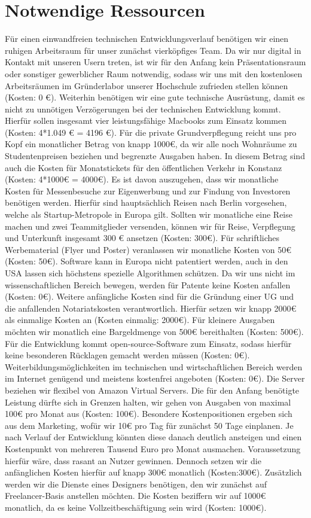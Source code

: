 \section{Notwendige Ressourcen}
Für einen einwandfreien technischen Entwicklungsverlauf benötigen wir einen ruhigen Arbeitsraum für unser zunächst vierköpfiges Team. Da wir nur digital in Kontakt mit unseren Usern treten, ist wir für den Anfang kein Präsentationsraum oder sonstiger gewerblicher Raum notwendig, sodass wir uns mit den kostenlosen Arbeitsräumen im Gründerlabor unserer Hochschule zufrieden stellen können (Kosten: 0 €). 
Weiterhin benötigen wir eine gute technische Ausrüstung, damit es nicht zu unnötigen Verzögerungen bei der technischen Entwicklung kommt. Hierfür sollen insgesamt vier leistungsfähige Macbooks zum Einsatz kommen (Kosten: 4*1.049 € = 4196 €).
Für die private Grundverpflegung reicht uns pro Kopf ein monatlicher Betrag von knapp 1000€, da wir alle noch Wohnräume zu Studentenpreisen beziehen und begrenzte Ausgaben haben. In diesem Betrag sind auch die Kosten für Monatstickets für den öffentlichen Verkehr in Konstanz (Kosten: 4*1000€ = 4000€).
Es ist davon auszugehen, dass wir monatliche Kosten für Messenbesuche zur Eigenwerbung und zur Findung von Investoren benötigen werden. Hierfür sind hauptsächlich Reisen nach Berlin vorgesehen, welche als Startup-Metropole in Europa gilt. Sollten wir monatliche eine Reise machen und zwei Teammitglieder versenden, können wir für Reise, Verpflegung und Unterkunft insgesamt 300 € ansetzen (Kosten: 300€).
Für schriftliches Werbematerial (Flyer und Poster) veranlassen wir monatliche Kosten von 50€ (Kosten: 50€).
Software kann in Europa nicht patentiert werden, auch in den USA lassen sich höchstens spezielle Algorithmen schützen. Da wir uns nicht im wissenschaftlichen Bereich bewegen, werden für Patente keine Kosten anfallen (Kosten: 0€).
Weitere anfängliche Kosten sind für die Gründung einer UG und die anfallenden Notariatskosten verantwortlich. Hierfür setzen wir knapp 2000€ als einmalige Kosten an (Kosten einmalig: 2000€).
Für kleinere Ausgaben möchten wir monatlich eine Bargeldmenge von 500€ bereithalten (Kosten: 500€).
Für die Entwicklung kommt open-source-Software zum Einsatz, sodass hierfür keine besonderen Rücklagen gemacht werden müssen (Kosten: 0€).
Weiterbildungsmöglichkeiten im technischen und wirtschaftlichen Bereich werden im Internet genügend und meistens kostenfrei angeboten  (Kosten: 0€).
Die Server beziehen wir flexibel von Amazon Virtual Servers. Die für den Anfang benötigte Leistung dürfte sich in Grenzen halten, wir gehen von Ausgaben von maximal 100€ pro Monat aus  (Kosten: 100€).
Besondere Kostenpositionen ergeben sich aus dem Marketing, wofür wir 10€ pro Tag für zunächst 50 Tage einplanen. Je nach Verlauf der Entwicklung könnten diese danach deutlich ansteigen und einen Kostenpunkt von mehreren Tausend Euro pro Monat ausmachen. Voraussetzung hierfür wäre, dass rasant an Nutzer gewinnen. Dennoch setzen wir die anfänglichen Kosten hierfür auf knapp 300€ monatlich  (Kosten:300€).
Zusätzlich werden wir die Dienste eines Designers benötigen, den wir zunächst auf Freelancer-Basis anstellen möchten. Die Kosten beziffern wir auf 1000€ monatlich, da es keine Vollzeitbeschäftigung sein wird  (Kosten: 1000€).

